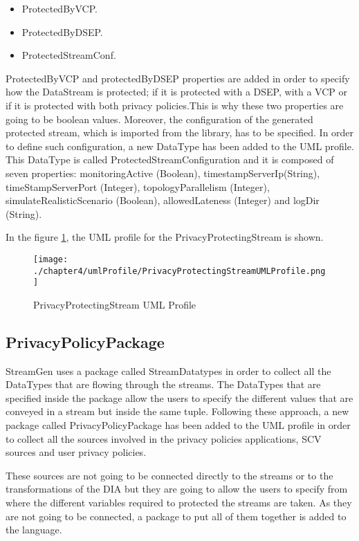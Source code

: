 \begin{itemize}
\item ProtectedByVCP.
\item ProtectedByDSEP.
\item ProtectedStreamConf.
\end{itemize}

ProtectedByVCP and protectedByDSEP properties are added in order to specify how the DataStream is protected; if it is protected with a DSEP, with a VCP or if it is protected with both privacy policies.This is why these two properties are going to be boolean values. Moreover, the configuration of the generated protected stream, which is imported from the library, has to be specified. In order to define such configuration, a new DataType has been added to the UML profile. This DataType is called ProtectedStreamConfiguration and it is composed of seven properties: monitoringActive (Boolean), timestampServerIp(String), timeStampServerPort (Integer), topologyParallelism (Integer), simulateRealisticScenario (Boolean), allowedLateness (Integer) and logDir (String).

In the figure \ref{fig:PrivacyProtectingStream UML Profile}, the UML profile for the PrivacyProtectingStream is shown.

\begin{figure}
\centering
{\texttt{[image: ./chapter4/umlProfile/PrivacyProtectingStreamUMLProfile.png]}}
\caption{PrivacyProtectingStream UML Profile}
\label{fig:PrivacyProtectingStream UML Profile}
\end{figure}

\subsection{PrivacyPolicyPackage}

StreamGen uses a package called StreamDatatypes in order to collect all the DataTypes that are flowing through the streams. The DataTypes that are specified inside the package allow the users to specify the different values that are conveyed in a stream but inside the same tuple. Following these approach, a new package called PrivacyPolicyPackage has been added to the UML profile in order to collect all the sources involved in the privacy policies applications, SCV sources and user privacy policies.

These sources are not going to be connected directly to the streams or to the transformations of the DIA but they are going to allow the users to specify from where the different variables required to protected the streams are taken. As they are not going to be connected, a package to put all of them together is added to the language.

